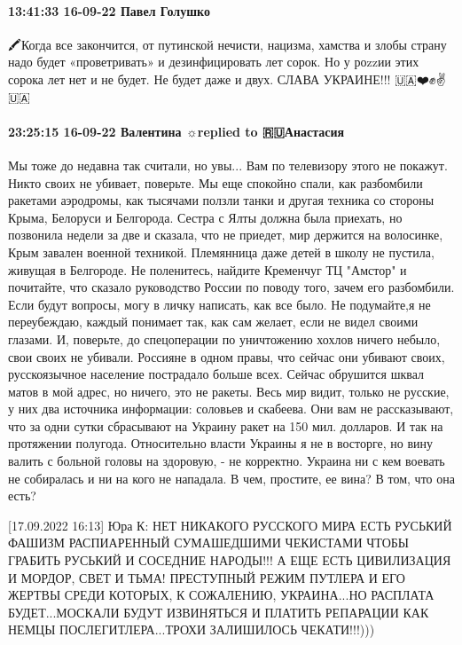 \paragraph{13:41:33 16-09-22 Павел Голушко}

🖍Когда все закончится, от путинской нечисти, нацизма, хамства и злобы страну надо будет «проветривать» и дезинфицировать лет сорок. Но у роzzии этих сорока лет нет и не будет. Не будет даже и двух.
СЛАВА УКРАИНЕ!!!
🇺🇦❤️✊✌️🇺🇦

\paragraph{23:25:15 16-09-22 Валентина ☼replied to 🇷🇺Анастасия}

Мы тоже до недавна так считали, но увы... Вам по телевизору этого не покажут.
Никто своих не убивает, поверьте. Мы еще спокойно спали, как разбомбили
ракетами аэродромы, как тысячами ползли танки и другая техника со стороны
Крыма, Белоруси и Белгорода. Сестра с Ялты должна была приехать, но позвонила
недели за две и сказала, что не приедет, мир держится на волосинке, Крым
завален военной техникой. Племянница даже детей в школу не пустила, живущая в
Белгороде. Не поленитесь, найдите Кременчуг ТЦ "Амстор" и почитайте, что
сказало руководство России по поводу того, зачем его разбомбили. Если будут
вопросы, могу в личку написать, как все было. Не подумайте,я не переубеждаю,
каждый понимает так, как сам желает, если не видел своими глазами. И, поверьте,
до спецоперации по уничтожению хохлов ничего небыло, свои своих не убивали.
Россияне в одном правы, что сейчас они убивают своих, русскоязычное население
пострадало больше всех. Сейчас обрушится шквал матов в мой адрес, но ничего,
это не ракеты. Весь мир видит, только не русские, у них два источника
информации: соловьев и скабеева. Они вам не рассказывают, что за одни сутки
сбрасывают на Украину ракет на 150 мил. долларов. И так на протяжении полугода.
Относительно власти Украины я не в восторге, но вину валить с больной головы на
здоровую, - не корректно. Украина ни с кем воевать не собиралась и ни на кого
не нападала. В чем, простите, ее вина? В том, что она есть?


[17.09.2022 16:13] Юра К: НЕТ НИКАКОГО РУССКОГО МИРА ЕСТЬ РУСЬКИЙ ФАШИЗМ
РАСПИАРЕННЫЙ СУМАШЕДШИМИ ЧЕКИСТАМИ ЧТОБЫ ГРАБИТЬ РУСЬКИЙ И СОСЕДНИЕ НАРОДЫ!!! А
ЕЩЕ ЕСТЬ ЦИВИЛИЗАЦИЯ И МОРДОР, СВЕТ И ТЬМА! ПРЕСТУПНЫЙ РЕЖИМ ПУТЛЕРА И ЕГО
ЖЕРТВЫ СРЕДИ КОТОРЫХ, К СОЖАЛЕНИЮ, УКРАИНА...НО РАСПЛАТА БУДЕТ...МОСКАЛИ БУДУТ
ИЗВИНЯТЬСЯ И ПЛАТИТЬ РЕПАРАЦИИ КАК НЕМЦЫ ПОСЛЕГИТЛЕРА...ТРОХИ ЗАЛИШИЛОСЬ
ЧЕКАТИ!!!)))

